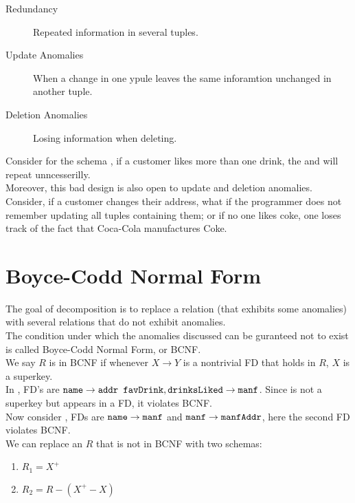 \documentclass[11pt,a4paper,twocolumn]{book}
\begin{document}
\begin{description}
\item[Redundancy] Repeated information in several tuples.
\item[Update Anomalies] When a change in one ypule leaves the same inforamtion unchanged in another tuple.
\item[Deletion Anomalies] Losing information when deleting.
\end{description}

Consider for the schema , if a customer likes more than one drink, the  and  will repeat unncesserilly.\\

Moreover, this bad design is also open to update and deletion anomalies. Consider, if a customer changes their address, what if the programmer does not remember updating all tuples containing them; or if no one likes coke, one loses track of the fact that Coca-Cola manufactures Coke.

\section{Boyce-Codd Normal Form}

The goal of decomposition is to replace a relation (that exhibits some anomalies) with several relations that do not exhibit anomalies.\\

The condition under which the anomalies discussed can be guranteed not to exist is called Boyce-Codd Normal Form, or BCNF.\\

We say $R$ is in BCNF if whenever $X \to Y$ is a nontrivial FD that holds in $R$, $X$ is a superkey.\\

In , FD's are $\texttt{name} \to \texttt{addr favDrink}, \texttt{drinksLiked} \to \texttt{manf}$. Since  is not a superkey but appears in a FD, it violates BCNF.\\

Now consider , FDs are $\texttt{name} \to \texttt{manf}$ and $\texttt{manf} \to \texttt{manfAddr}$, here the second FD violates BCNF.\\

We can replace an $R$ that is not in BCNF with two schemas:

\begin{enumerate}
\item $R_1 = X^+$
\item $R_2 = R -(X^+ - X)$
\end{enumerate}
\end{document}
